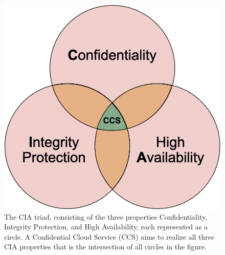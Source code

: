  \begin{figure}[t]
	\includegraphics[scale=0.17]{pictures/cia_new}
	\caption{The CIA triad, consisting of the three properties Confidentiality, Integrity Protection, and High Availability, each represented as a circle. A Confidential Cloud Service (CCS) aims to realize all three CIA properties that is the intersection of all circles in the figure.  }
	\label{cia}
\end{figure}